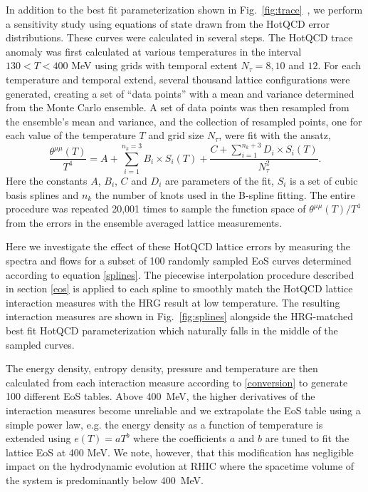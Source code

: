 \documentclass[aps,prc,reprint,amsmath,nofootinbib,superscriptaddress]{revtex4-1}
\begin{document}
In addition to the best fit parameterization shown in Fig.~\ref{fig:trace}~, we perform a sensitivity study using equations of state drawn from the HotQCD error distributions.  These curves were calculated in several steps.
The HotQCD trace anomaly was first calculated at various temperatures in the interval $130 < T < 400$ MeV using grids with temporal extent $N_\tau = 8,10$ and $12$.
For each temperature and temporal extend, several thousand lattice configurations were generated, creating a set of ``data points'' with a mean and variance determined from the Monte Carlo ensemble. 
A set of data points was then resampled from the ensemble's mean and variance, and the collection of resampled points, one for each value of the temperature $T$ and grid size $N_\tau$, were fit with the ansatz,
\begin{equation}
 \label{splines}
 \frac{\theta^{\mu\mu}(T)}{T^4} = A + \sum\limits_{i=1}^{n_k=3} B_i \times S_i(T) + \frac{C + \sum_{i=1}^{n_k + 3} D_i \times S_i(T)}{N_\tau^2}.
\end{equation}
Here the constants $A$, $B_i$, $C$ and $D_i$ are parameters of the fit, $S_i$ is a set of cubic basis splines and $n_k$ the number of knots used in the B-spline fitting. 
The entire procedure was repeated 20,001 times to sample the function space of $\theta^{\mu\mu}(T)/T^4$ from the errors in the ensemble averaged lattice measurements.

Here we investigate the effect of these HotQCD lattice errors by measuring the spectra and flows for a subset of 100 randomly sampled EoS curves determined according to equation \eqref{splines}.
The piecewise interpolation procedure described in section \ref{eos} is applied to each spline to smoothly match the HotQCD lattice interaction measures with the HRG result at low temperature. 
The resulting interaction measures are shown in Fig.~\ref{fig:splines} alongside the HRG-matched best fit HotQCD parameterization which naturally falls in the middle of the sampled curves.  

The energy density, entropy density, pressure and temperature are then calculated from each interaction measure according to \eqref{conversion} to generate 100 different EoS tables. 
Above 400~MeV, the higher derivatives of the interaction measures become unreliable and we extrapolate the EoS table using a simple power law, e.g. the energy density as a function of temperature is extended using $e(T) = a T^b$ where the coefficients $a$ and $b$ are tuned to fit the lattice EoS at 400 MeV. We note, however, that this modification has negligible impact on the hydrodynamic evolution at RHIC where the spacetime volume of the system is predominantly below 400~MeV.
\end{document}
